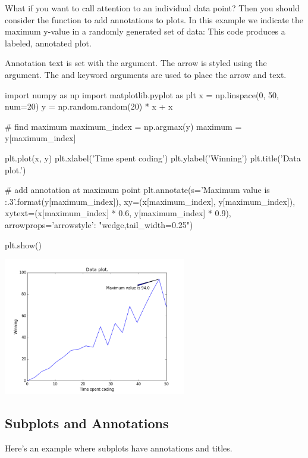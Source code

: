 \documentclass[11pt]{cselabheader}
\begin{document}
What if you want to call attention to an individual data point? Then
you should consider the  function to add
annotations to plots.  In this example we indicate the maximum y-value
in a randomly generated set of data: This code produces a labeled,
annotated plot.

Annotation text is set with the  argument. The arrow
is styled using the  argument.  The
 and  keyword arguments are used
to place the arrow and text.

\begin{python3code}
import numpy as np
import matplotlib.pyplot as plt
x = np.linspace(0, 50, num=20)
y = np.random.random(20) * x + x

# find maximum
maximum_index = np.argmax(y)
maximum = y[maximum_index]

plt.plot(x, y)
plt.xlabel('Time spent coding')
plt.ylabel('Winning')
plt.title('Data plot.')

# add annotation at maximum point
plt.annotate(s='Maximum value is {:.3}'.format(y[maximum_index]),
             xy=(x[maximum_index], y[maximum_index]),
             xytext=(x[maximum_index] * 0.6, y[maximum_index] * 0.9),
             arrowprops={'arrowstyle': "wedge,tail_width=0.25"})

plt.show()
\end{python3code}

\begin{center}
\includegraphics[width=0.6\textwidth]{img/matplotlib_labeled2.png}
\end{center}

\subsection{Subplots and Annotations}

Here's an example where subplots have annotations and titles.
\end{document}
